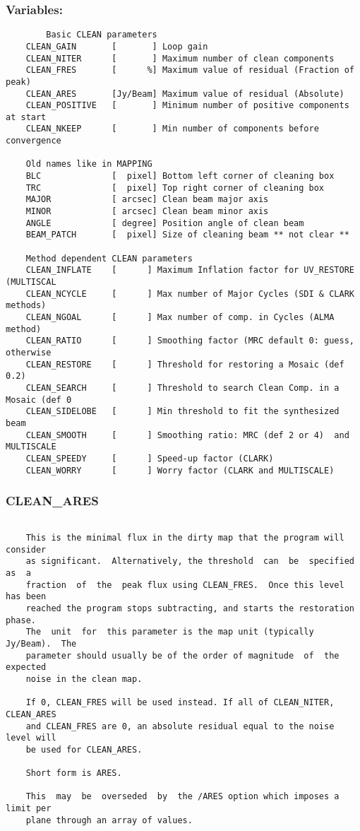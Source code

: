 \subsubsection{Variables:}
\begin{verbatim}
        Basic CLEAN parameters
    CLEAN_GAIN       [       ] Loop gain
    CLEAN_NITER      [       ] Maximum number of clean components
    CLEAN_FRES       [      %] Maximum value of residual (Fraction of peak)
    CLEAN_ARES       [Jy/Beam] Maximum value of residual (Absolute)
    CLEAN_POSITIVE   [       ] Minimum number of positive components at start
    CLEAN_NKEEP      [       ] Min number of components before convergence

    Old names like in MAPPING
    BLC              [  pixel] Bottom left corner of cleaning box
    TRC              [  pixel] Top right corner of cleaning box
    MAJOR            [ arcsec] Clean beam major axis
    MINOR            [ arcsec] Clean beam minor axis
    ANGLE            [ degree] Position angle of clean beam
    BEAM_PATCH       [  pixel] Size of cleaning beam ** not clear **

    Method dependent CLEAN parameters
    CLEAN_INFLATE    [      ] Maximum Inflation factor for UV_RESTORE (MULTISCAL
    CLEAN_NCYCLE     [      ] Max number of Major Cycles (SDI & CLARK methods)
    CLEAN_NGOAL      [      ] Max number of comp. in Cycles (ALMA method)
    CLEAN_RATIO      [      ] Smoothing factor (MRC default 0: guess, otherwise
    CLEAN_RESTORE    [      ] Threshold for restoring a Mosaic (def 0.2)
    CLEAN_SEARCH     [      ] Threshold to search Clean Comp. in a Mosaic (def 0
    CLEAN_SIDELOBE   [      ] Min threshold to fit the synthesized beam
    CLEAN_SMOOTH     [      ] Smoothing ratio: MRC (def 2 or 4)  and MULTISCALE
    CLEAN_SPEEDY     [      ] Speed-up factor (CLARK)
    CLEAN_WORRY      [      ] Worry factor (CLARK and MULTISCALE)

\end{verbatim}
\subsubsection{CLEAN\_ARES}
\begin{verbatim}

    This is the minimal flux in the dirty map that the program will consider
    as significant.  Alternatively, the threshold  can  be  specified  as  a
    fraction  of  the  peak flux using CLEAN_FRES.  Once this level has been
    reached the program stops subtracting, and starts the restoration phase.
    The  unit  for  this parameter is the map unit (typically Jy/Beam).  The
    parameter should usually be of the order of magnitude  of  the  expected
    noise in the clean map.

    If 0, CLEAN_FRES will be used instead. If all of CLEAN_NITER, CLEAN_ARES
    and CLEAN_FRES are 0, an absolute residual equal to the noise level will
    be used for CLEAN_ARES.

    Short form is ARES.

    This  may  be  overseded  by  the /ARES option which imposes a limit per
    plane through an array of values.

\end{verbatim}
